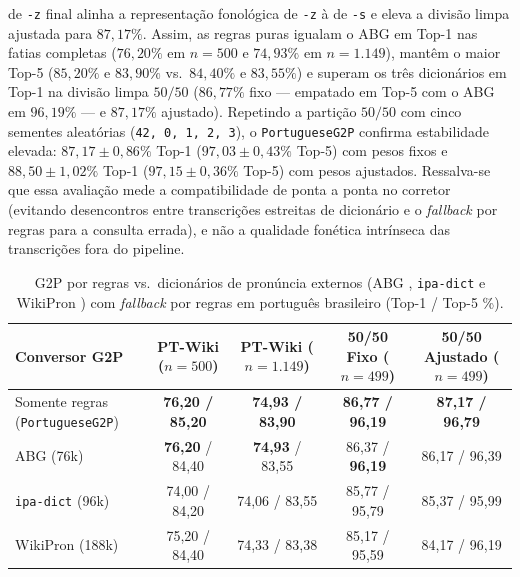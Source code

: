 \documentclass[a4paper, twocolumn, 11pt, twoside]{article}
\begin{document}
de \texttt{-z} final alinha a representação fonológica de \texttt{-z} à de \texttt{-s} e eleva a divisão limpa ajustada para $87{,}17\%$. Assim, as regras puras igualam o ABG em Top-1 nas fatias completas ($76{,}20\%$ em $n=500$ e $74{,}93\%$ em $n=1.149$), mantêm o maior Top-5 ($85{,}20\%$ e $83{,}90\%$ vs.\ $84{,}40\%$ e $83{,}55\%$) e superam os três dicionários em Top-1 na divisão limpa $50/50$ ($86{,}77\%$ fixo --- empatado em Top-5 com o ABG em $96{,}19\%$ --- e $87{,}17\%$ ajustado). Repetindo a partição $50/50$ com cinco sementes aleatórias (\texttt{42, 0, 1, 2, 3}), o \texttt{PortugueseG2P} confirma estabilidade elevada: $87{,}17\pm0{,}86\%$ Top-1 ($97{,}03\pm0{,}43\%$ Top-5) com pesos fixos e $88{,}50\pm1{,}02\%$ Top-1 ($97{,}15\pm0{,}36\%$ Top-5) com pesos ajustados. Ressalva-se que essa avaliação mede a compatibilidade de ponta a ponta no corretor (evitando desencontros entre transcrições estreitas de dicionário e o \textit{fallback} por regras para a consulta errada), e não a qualidade fonética intrínseca das transcrições fora do pipeline.

\begin{table}[ht]
\centering
\scriptsize
\setlength{\tabcolsep}{3.5pt}
\caption{G2P por regras vs.\ dicionários de pronúncia externos (ABG \citep{benevides2017abg}, \texttt{ipa-dict} \citep{opendictipadict} e WikiPron \citep{lee2020wikipron}) com \textit{fallback} por regras em português brasileiro (Top-1 / Top-5 \%).}
\label{tab:pt_dicts}
\begin{tabular}{lcccc}
\toprule
Conversor G2P & PT-Wiki ($n=500$) & PT-Wiki ($n=1.149$) & 50/50 Fixo ($n=499$) & 50/50 Ajustado ($n=499$) \\
\midrule
Somente regras (\texttt{PortugueseG2P}) & \textbf{76,20 / 85,20} & \textbf{74,93 / 83,90} & \textbf{86,77 / 96,19} & \textbf{87,17 / 96,79} \\
ABG (76k)      & \textbf{76,20} / 84,40 & \textbf{74,93} / 83,55 & 86,37 / \textbf{96,19} & 86,17 / 96,39 \\
\texttt{ipa-dict} (96k)    & 74,00 / 84,20 & 74,06 / 83,55 & 85,77 / 95,79 & 85,37 / 95,99 \\
WikiPron (188k) & 75,20 / 84,40 & 74,33 / 83,38 & 85,17 / 95,59 & 84,17 / 96,19 \\
\bottomrule
\end{tabular}
\end{table}
\end{document}
